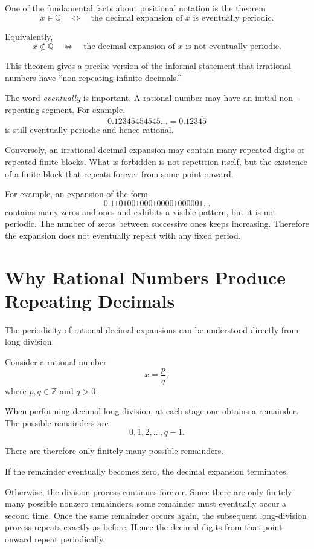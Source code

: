 \documentclass{essay}
\begin{document}
One of the fundamental facts about positional notation is the theorem
\[
  x\in\mathbb{Q}
  \quad\Longleftrightarrow\quad
  \text{the decimal expansion of \(x\) is eventually periodic}.
\]

Equivalently,
\[
  x\notin\mathbb{Q}
  \quad\Longleftrightarrow\quad
  \text{the decimal expansion of \(x\) is not eventually periodic}.
\]

This theorem gives a precise version of the informal statement that irrational numbers have ``non-repeating infinite decimals.''

The word \emph{eventually} is important. A rational number may have an initial non-repeating segment. For example,
\[ 0.12345454545\ldots = 0.123\overline{45} \]
is still eventually periodic and hence rational.

Conversely, an irrational decimal expansion may contain many repeated digits or repeated finite blocks. What is forbidden is not repetition itself, but the existence of a finite block that repeats forever from some point onward.

For example, an expansion of the form
\[ 0.1101001000100001000001\ldots \]
contains many zeros and ones and exhibits a visible pattern, but it is not periodic. The number of zeros between successive ones keeps increasing. Therefore the expansion does not eventually repeat with any fixed period.

\section{Why Rational Numbers Produce Repeating Decimals}

The periodicity of rational decimal expansions can be understood directly from long division.

Consider a rational number
\[ x=\frac{p}{q}, \]
where \(p,q\in\mathbb{Z}\) and \(q>0\).

When performing decimal long division, at each stage one obtains a remainder. The possible remainders are
\[ 0,1,2,\ldots,q-1. \]

There are therefore only finitely many possible remainders.

If the remainder eventually becomes zero, the decimal expansion terminates.

Otherwise, the division process continues forever. Since there are only finitely many possible nonzero remainders, some remainder must eventually occur a second time. Once the same remainder occurs again, the subsequent long-division process repeats exactly as before. Hence the decimal digits from that point onward repeat periodically.
\end{document}
